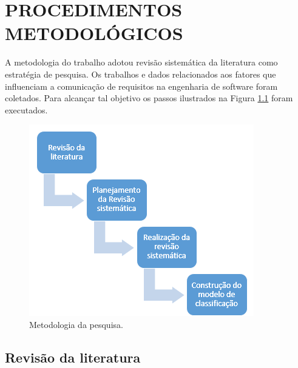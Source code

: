 \chapter{PROCEDIMENTOS METODOLÓGICOS}
\label{chap:metodologia}






A metodologia do trabalho adotou revisão sistemática da literatura \cite{kitchenham} como estratégia de pesquisa. Os trabalhos e dados relacionados aos fatores que influenciam a comunicação de requisitos na engenharia de software foram coletados. Para alcançar tal objetivo os passos ilustrados na Figura \ref{fig:metodologia} foram executados.

\begin{figure}[h!]
	\caption{Metodologia da pesquisa.}
	\begin{center}
	    \includegraphics[scale=1.0]{figuras/metodologia}
	\end{center}
	\label{fig:metodologia}
\end{figure}
   
   
\section{Revisão da literatura}

